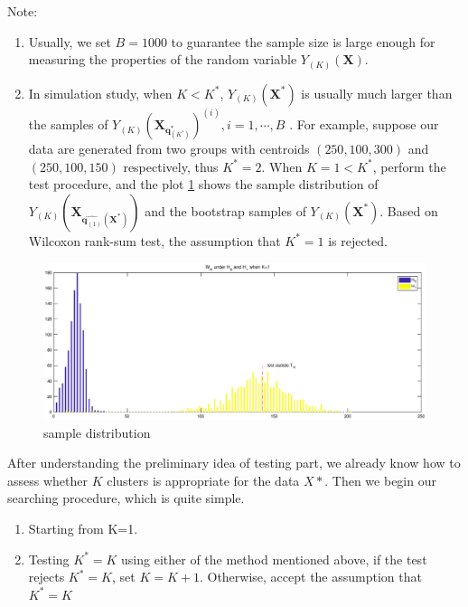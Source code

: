 \documentclass[12pt]{article}
\begin{document}
Note: 
\begin{enumerate}[(1):]
\item Usually, we set $B=1000$ to guarantee the sample size is large enough for measuring the properties of the random variable $Y_{(K)}(\pmb X)$.
\item In simulation study, when $K<K^*$, $Y_{(K)}(\pmb X^*)$ is usually much larger than the samples of $Y_{(K)}(\pmb X_{\pmb q_{(K^*)}^*})^{(i)},i=1,\cdots,B$ . For example, suppose our data are generated from two groups with centroids $(250,100,300)$ and $(250,100,150)$ respectively, thus $K^*=2$. When $K=1<K^*$, perform the test procedure, and the plot \ref{fig:sample_distribution} shows the sample distribution of $Y_{(K)}(\pmb X_{\hat{\pmb q_{(1)}}(\pmb X^*)})$ and the bootstrap samples of $Y_{(K)}(\pmb X^*)$. Based on Wilcoxon rank-sum test, the assumption that $K^*=1$ is rejected.

\end{enumerate}

\begin{figure} [htp]
 \includegraphics[width=\textwidth,height=0.6\textheight]{./figure/sample_distribution.eps}
  \vspace{-30pt}
  \caption{sample distribution }\label{fig:sample_distribution}
\end{figure} %


 After understanding the preliminary idea of testing part, we already know how to assess whether $K$ clusters is appropriate for the data $X*$. Then we begin our searching procedure, which is quite simple.


\begin{enumerate}[Step 1:]
  
\item Starting from K=1.
\item Testing $K^*=K$ using either of the method mentioned above, if the test rejects $K^*=K$, set $K=K+1$. Otherwise, accept the assumption that $K^*=K$

  
\end{enumerate}
\end{document}
